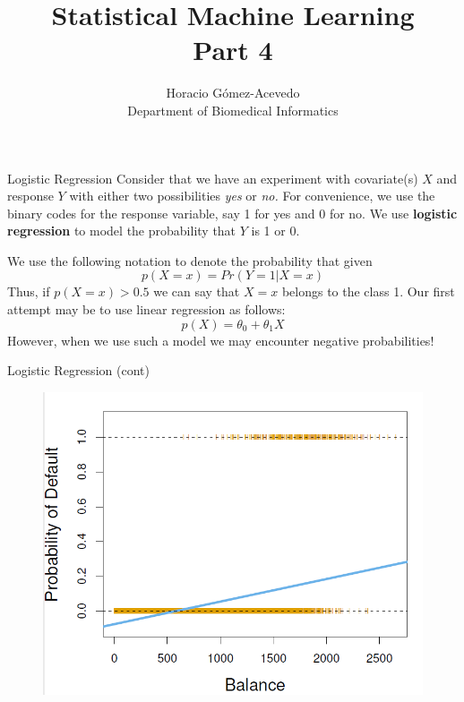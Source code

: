 \documentclass{beamer}
\title{Statistical Machine Learning\\ Part 4}
\author{Horacio G\'omez-Acevedo\\ Department of Biomedical Informatics}
\begin{document}
	\begin{frame}[plain]
		\maketitle
	\end{frame}
\begin{frame}{Logistic Regression}
	Consider that we have an experiment with covariate(s) $X$ and response $Y$ with either two possibilities {\it yes} or {\it no.}
	For convenience, we use the binary codes for the response variable, say 1 for yes and 0 for no. We use {\bf logistic regression} to model the probability that $Y$ is 1 or 0. 
	
	We use the following notation to denote the probability that given 
	\begin{equation*}
		p(X=x)= Pr(Y=1 | X=x)
	\end{equation*}
 Thus, if $p(X=x)>0.5$ we can say that $X=x$ belongs to the class 1. 
 Our first attempt may be to use linear regression as follows:
 \begin{equation*}
 	p(X)= \theta_0+ \theta_1 X
 \end{equation*}
However, when we use such a model we may encounter negative probabilities!

\end{frame}

\begin{frame}{Logistic Regression (cont)}
	
		\begin{figure}[h]
		\centering
		\includegraphics[scale=0.5]{../../Figures/fig_logreg.png}
	\end{figure}
\end{frame}
\end{document}
